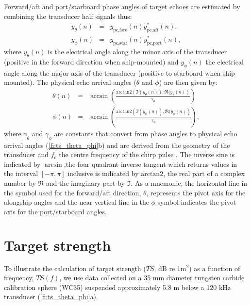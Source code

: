 \documentclass[preprint,12pt,TurnOnLineNumbers]{JASAnew}
\newcommand{\samplesymt}{n}
\newcommand{\fc}{f_{\textrm{c}}}
\newcommand{\athw}{\phi}
\newcommand{\along}{\theta}
\newcommand{\atan}{\textrm{arctan2}}
\newcommand{\anglefalong}{\gamma_\along}
\newcommand{\anglefathw}{\gamma_\athw}
\begin{document}
Forward/aft and port/starboard phase angles of target echoes are estimated by combining the transducer half signals thus: 
%
\begin{eqnarray}
\label{eq:phase1}
y_\along(\samplesymt) & = & y_{\textrm{pc,fore}}(\samplesymt) y_{\textrm{pc,aft}}^*(\samplesymt), \\
y_\athw(\samplesymt) & = & y_{\textrm{pc,star}}(\samplesymt) y_{\textrm{pc,port}}^*(\samplesymt),
\end{eqnarray}
%
where $y_\along(\samplesymt)$ is the electrical angle along the minor axis of the transducer (positive in the forward direction when ship-mounted) and $y_\athw(\samplesymt)$ the electrical angle along the major axis of the transducer (positive to starboard when ship-mounted). The physical echo arrival angles ($\along$ and $\athw$) are then given by:
%
\begin{eqnarray}
\label{eq:phase2}
\along(\samplesymt) & = & \arcsin\left( \frac{\atan\left( \Im(y_\along(\samplesymt)), \Re(y_\along(\samplesymt) \right)}{\anglefalong}\right) \\
\athw(\samplesymt) & = & \arcsin\left( \frac{\atan\left( \Im(y_\athw(\samplesymt)), \Re(y_\athw(\samplesymt) \right)}{\anglefathw}\right),
\end{eqnarray}
%
where $\anglefalong$ and $\anglefathw$ are constants that convert from phase angles to physical echo arrival angles (\autoref{fi:ts_theta_phi}b) and are derived from the geometry of the transducer \citep{Urick3rdPrinciples} and $\fc$ the centre frequency of the chirp pulse \citep{ehrenberg1979}. The inverse sine is indicated by $\arcsin$,the four quadrant inverse tangent which returns values in the interval $[-\pi, \pi]$ inclusive is indicated by $\atan$, the real part of a complex number by $\Re$ and the imaginary part by $\Im$. As a mnemonic, the horizontal line in the symbol used for the forward/aft direction, $\along$, represents the pivot axis for the alongship angles and the near-vertical line in the $\athw$ symbol indicates the pivot axis for the port/starboard angles.
%

\clearpage
\section{Target strength}

To illustrate the calculation of target strength ($TS$, dB re 1m$^2$) as a function of frequency, $TS(f)$, we use data collected on a 35 mm diameter tungsten carbide calibration sphere (WC35) suspended approximately 5.8 m below a 120 kHz transducer (\autoref{fi:ts_theta_phi}a). 
\end{document}
